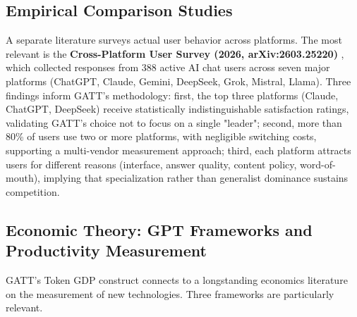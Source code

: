 \documentclass[11pt,a4paper]{article}
\begin{document}
\subsection{Empirical Comparison Studies}

A separate literature surveys actual user behavior across platforms. The most relevant is the \textbf{Cross-Platform User Survey (2026, arXiv:2603.25220)} \cite{crossplatform2026survey}, which collected responses from 388 active AI chat users across seven major platforms (ChatGPT, Claude, Gemini, DeepSeek, Grok, Mistral, Llama). Three findings inform GATT's methodology: first, the top three platforms (Claude, ChatGPT, DeepSeek) receive statistically indistinguishable satisfaction ratings, validating GATT's choice not to focus on a single "leader"; second, more than 80\% of users use two or more platforms, with negligible switching costs, supporting a multi-vendor measurement approach; third, each platform attracts users for different reasons (interface, answer quality, content policy, word-of-mouth), implying that specialization rather than generalist dominance sustains competition.

\subsection{Economic Theory: GPT Frameworks and Productivity Measurement}

GATT's Token GDP construct connects to a longstanding economics literature on the measurement of new technologies. Three frameworks are particularly relevant.
\end{document}
